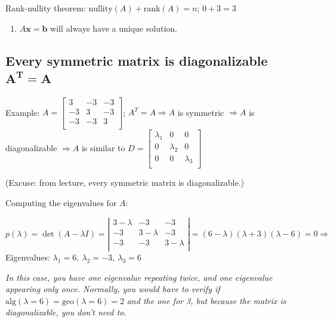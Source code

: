 \documentclass[
]{article}
\begin{document}
Rank-nullity theorem: $\text{nullity}(A) + \text{rank}(A) = n$;
$0 + 3 = 3$

\begin{enumerate}
\def\labelenumi{\arabic{enumi}.}
\setcounter{enumi}{4}
\item
  $A\mathbf{x} = \mathbf{b}$ will always have a unique
  solution.
\end{enumerate}


\subsection{\texorpdfstring{Every symmetric matrix is diagonalizable
$\mathbf{A}^{\mathbf{T}}\mathbf{= A}$}{Every symmetric matrix is diagonalizable \textbackslash mathbf\{A\}\^{}\{\textbackslash mathbf\{T\}\}\textbackslash mathbf\{= A\}}}

Example: $A = \begin{bmatrix}
3 & - 3 & - 3 \\
 - 3 & 3 & - 3 \\
 - 3 & - 3 & 3 \\
\end{bmatrix}$; $A^{T} = A \Rightarrow A$ is symmetric
$\Rightarrow A$ is diagonalizable $\Rightarrow A$ is similar to
$D = \begin{bmatrix}
\lambda_{1} & 0 & 0 \\
0 & \lambda_{2} & 0 \\
0 & 0 & \lambda_{3} \\
\end{bmatrix}$

(Excuse: from lecture, every symmetric matrix is diagonalizable.)

Computing the eigenvalues for $A$:

$p(\lambda) = \det(A - \lambda I) = \left| \begin{matrix}
3 - \lambda & - 3 & - 3 \\
 - 3 & 3 - \lambda & - 3 \\
 - 3 & - 3 & 3 - \lambda \\
\end{matrix} \right| = (6 - \lambda)(\lambda + 3)(\lambda - 6) = 0 \Rightarrow$
Eigenvalues: $\lambda_{1} = 6,\ \lambda_{2} = - 3,\ \lambda_{3} = 6$

\emph{In this case, you have one eigenvalue repeating twice, and one
eigenvalue appearing only once. Normally, you would have to verify if}
$\text{alg}(\lambda = 6) = \text{geo}(\lambda = 6) = 2$ \emph{and the
one for 3, but because the matrix is diagonalizable, you don't need to.}
\end{document}

